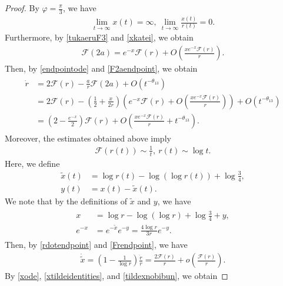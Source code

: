 \documentclass[10pt,a4paper]{amsart}
\numberwithin{equation}{section}
\begin{document}
\begin{proof}
By $\varphi=\frac{\pi}{3}$, we have
\begin{align}\label{xkatei}
\lim_{t\to\infty}x(t)=\infty,\ \lim_{t\to\infty}\frac{x(t)}{r(t)}=0.
\end{align}
Furthermore, by \eqref{tukaeruF3} and \eqref{xkatei}, we obtain
\begin{align}\label{F2aendpoint}
\mathcal{F}(2a)=e^{-x}\mathcal{F}(r)+O\left(\frac{xe^{-x}\mathcal{F}(r)}{r}\right).
\end{align}
Then, by \eqref{endpointode} and \eqref{F2aendpoint}, we obtain
\begin{align}\label{rdotendpoint}
\begin{aligned}
\dot{r}&=2\mathcal{F}(r)-\frac{a}{r}\mathcal{F}(2a)+O\left(t^{-\theta_{13}}\right)
\\
&=2\mathcal{F}(r)-\left(\frac{1}{2}+\frac{x}{2r}\right)\left(e^{-x}\mathcal{F}(r)+O\left(\frac{xe^{-x}\mathcal{F}(r)}{r}\right)\right)+O\left(t^{-\theta_{13}}\right)
\\
&=\left(2-\frac{e^{-x}}{2}\right)\mathcal{F}(r)+O\left(\frac{xe^{-x}\mathcal{F}(r)}{r}+t^{-\theta_{13}}\right).
\end{aligned}
\end{align}
Moreover, the estimates obtained above imply
\begin{align}\label{Frendpoint}
\mathcal{F}(r(t))\sim\frac{1}{t},\ r(t)\sim\log{t}.
\end{align}
Here, we define
\begin{align*}
\tilde{x}(t)&=\log{r(t)}-\log{(\log{r(t)})}+\log{\frac{3}{4}},
\\
y(t)&=x(t)-\tilde{x}(t).
\end{align*}
We note that by the definitions of $\tilde{x}$ and $y$, we have
\begin{align}\label{xtildeidentities}
\begin{aligned}
x&=\log{r}-\log{(\log{r})}+\log{\frac{3}{4}}+y,
\\
e^{-x}&=e^{-\tilde{x}}e^{-y}=\frac{4\log{r}}{3r}e^{-y}.
\end{aligned}
\end{align}
Then, by \eqref{rdotendpoint} and \eqref{Frendpoint}, we have
\begin{align}\label{tildexnobibun}
\dot{\tilde{x}}=\left(1-\frac{1}{\log{r}}\right)\frac{\dot{r}}{r}=\frac{2\mathcal{F}(r)}{r}+o\left(\frac{\mathcal{F}(r)}{r}\right).
\end{align}
By \eqref{xode}, \eqref{xtildeidentities}, and \eqref{tildexnobibun}, we obtain

\end{proof}
\end{document}
